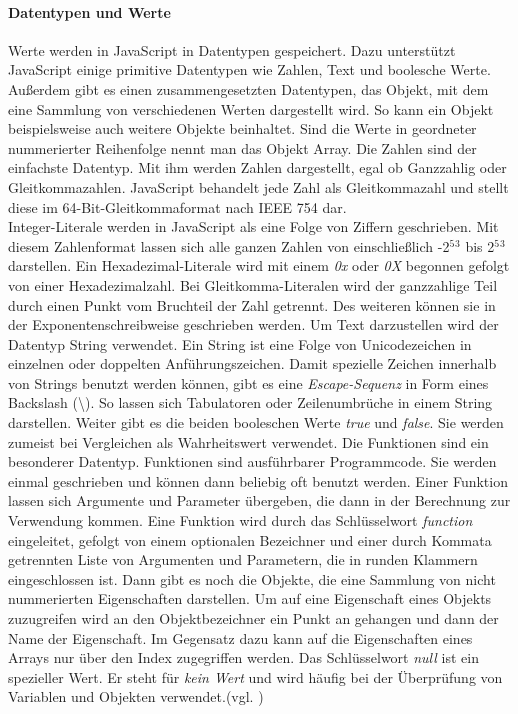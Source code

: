 \documentclass[12pt,a4paper,bibliography=totocnumbered,listof=totocnumbered]{scrartcl}
\begin{document}
\paragraph{Datentypen und Werte} Werte werden in JavaScript in Datentypen gespeichert. Dazu unterstützt JavaScript einige primitive Datentypen wie Zahlen, Text und boolesche Werte. Außerdem gibt es einen zusammengesetzten Datentypen, das Objekt, mit dem eine Sammlung von verschiedenen Werten dargestellt wird. So kann ein Objekt beispielsweise auch weitere Objekte beinhaltet. Sind die Werte in geordneter nummerierter Reihenfolge nennt man das Objekt Array. Die Zahlen sind der einfachste Datentyp. Mit ihm werden Zahlen dargestellt, egal ob Ganzzahlig oder Gleitkommazahlen. JavaScript behandelt jede Zahl als Gleitkommazahl und stellt diese im 64-Bit-Gleitkommaformat nach IEEE 754 dar.\\Integer-Literale werden in JavaScript als eine Folge von Ziffern geschrieben. Mit diesem Zahlenformat lassen sich alle ganzen Zahlen von einschließlich -2$^5$$^3$ bis 2$^5$$^3$ darstellen. Ein Hexadezimal-Literale wird mit einem \textit{0x} oder \textit{0X} begonnen gefolgt von einer Hexadezimalzahl. Bei Gleitkomma-Literalen wird der ganzzahlige Teil durch einen Punkt vom Bruchteil der Zahl getrennt. Des weiteren können sie in der Exponentenschreibweise geschrieben werden. Um Text darzustellen wird der Datentyp String verwendet. Ein String ist eine Folge von Unicodezeichen in einzelnen oder doppelten Anführungszeichen. Damit spezielle Zeichen innerhalb von Strings benutzt werden können, gibt es eine \textit{Escape-Sequenz} in Form eines Backslash (\textbackslash). So lassen sich Tabulatoren oder Zeilenumbrüche in einem String darstellen. Weiter gibt es die beiden booleschen Werte \textit{true} und \textit{false}. Sie werden zumeist bei Vergleichen als Wahrheitswert verwendet. Die Funktionen sind ein besonderer Datentyp. Funktionen sind ausführbarer Programmcode. Sie werden einmal geschrieben und können dann beliebig oft benutzt werden. Einer Funktion lassen sich Argumente und Parameter übergeben, die dann in der Berechnung zur Verwendung kommen. Eine Funktion wird durch das Schlüsselwort \textit{function} eingeleitet, gefolgt von einem optionalen Bezeichner und einer durch Kommata getrennten Liste von Argumenten und Parametern, die in runden Klammern eingeschlossen ist. Dann gibt es noch die Objekte, die eine Sammlung von nicht nummerierten Eigenschaften darstellen. Um auf eine Eigenschaft eines Objekts zuzugreifen wird an den Objektbezeichner ein Punkt an gehangen und dann der Name der Eigenschaft. Im Gegensatz dazu kann auf die Eigenschaften eines Arrays nur über den Index zugegriffen werden. Das Schlüsselwort \textit{null} ist ein spezieller Wert. Er steht für \textit{kein Wert} und wird häufig bei der Überprüfung von Variablen und Objekten verwendet.(vgl. \cite[S.22ff]{FlanJava2007})
	
\end{document}
